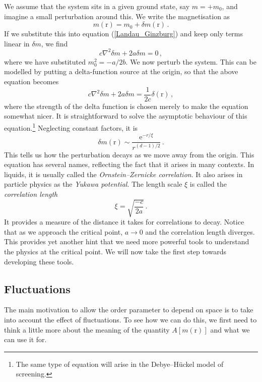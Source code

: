 \documentclass{article}
\theoremstyle{plain}\theoremheaderfont{\normalfont\bfseries}\theorembodyfont{\rmfamily}\theoremseparator{.}\newtheorem*{thm}{Theorem}\newtheorem*{law}{Law}\newtheorem*{pos}{Postulate}
\numberwithin{equation}{section}
\newcommand{\ee}{\mathrm{e}}
\newcommand{\vb}[1]{\bm{\mathrm{#1}}}
\newcommand{\laplacian}{\nabla^2}
\begin{document}
    We assume that the system sits in a given ground state, say \(m=+m_0\), and imagine a small perturbation around this. We write the magnetisation as
    \begin{equation}
        m(\vb{r})=m_0+\delta m(\vb{r})\,.
    \end{equation}
    If we substitute this into equation (\ref{Landau_Ginzburg}) and keep only terms linear in \(\delta m\), we find
    \begin{equation}
        c\laplacian\delta m+2a\delta m=0\,,
    \end{equation}
    where we have substituted \(m_0^2=-a/2b\). We now perturb the system. This can be modelled by putting a delta-function source at the origin, so that the above equation becomes
    \begin{equation}
        c\laplacian\delta m+2a\delta m=\frac{1}{2c}\delta(\vb{r})\,,
    \end{equation}
    where the strength of the delta function is chosen merely to make the equation somewhat nicer. It is straightforward to solve the asymptotic behaviour of this equation.\footnote{The same type of equation will arise in the Debye--H\"{u}ckel model of screening.} Neglecting constant factors, it is
    \begin{equation}
        \delta m(\vb{r})\sim\frac{\ee^{-r/\xi}}{r^{(d-1)/2}}\,.
    \end{equation}
    This tells us how the perturbation decays as we move away from the origin. This equation has several names, reflecting the fact that it arises in many contexts. In liquids, it is usually called the \textit{Ornstein--Zernicke correlation}. It also arises in particle physics as the \textit{Yukawa potential}. The length scale \(\xi\) is called the \textit{correlation length}
    \begin{equation}
        \xi=\sqrt{\frac{-c}{2a}}\,.
    \end{equation}
    It provides a measure of the distance it takes for correlations to decay. Notice that as we approach the critical point, \(a\to 0\) and the correlation length diverges. This provides yet another hint that we need more powerful tools to understand the physics at the critical point. We will now take the first step towards developing these tools.

    \subsection{Fluctuations}
    The main motivation to allow the order parameter to depend on space is to take into account the effect of fluctuations. To see how we can do this, we first need to think a little more about the meaning of the quantity \(A[m(\vb{r})]\) and what we can use it for.
\end{document}

